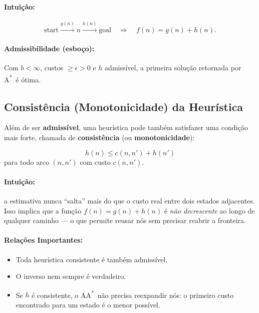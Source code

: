 \documentclass[9pt,a4paper]{extarticle}
\newcommand{\Astar}{A\textsuperscript{*}}
\begin{document}
\paragraph{Intuição:}
\[
\text{start} \xrightarrow{g(n)} n \xrightarrow{h(n)} \text{goal}
\quad \Rightarrow \quad f(n) = g(n) + h(n).
\]

\paragraph{Admissibilidade (esboço):}
Com $b<\infty$, custos $\ge \epsilon>0$ e $h$ admissível, a primeira solução retornada por \Astar\ é ótima.

\subsection*{Consistência (Monotonicidade) da Heurística}

Além de ser \textbf{admissível}, uma heurística pode também satisfazer uma condição mais forte,
chamada de \textbf{consistência} (ou \textbf{monotonicidade}):

\[
  h(n) \le c(n, n') + h(n')
\]
para todo arco $(n, n')$ com custo $c(n, n')$.

\paragraph{Intuição:}
a estimativa nunca “salta” mais do que o custo real entre dois estados adjacentes.
Isso implica que a função $f(n)=g(n)+h(n)$ é \emph{não decrescente}
ao longo de qualquer caminho — o que permite reusar nós sem precisar reabrir a fronteira.

\paragraph{Relações Importantes:}
\begin{itemize}
  \item Toda heurística consistente é também admissível.
  \item O inverso nem sempre é verdadeiro.
  \item Se $h$ é consistente, o A\Astar\ não precisa reexpandir nós: o primeiro custo encontrado para um estado é o menor possível.
\end{itemize}

\end{document}
